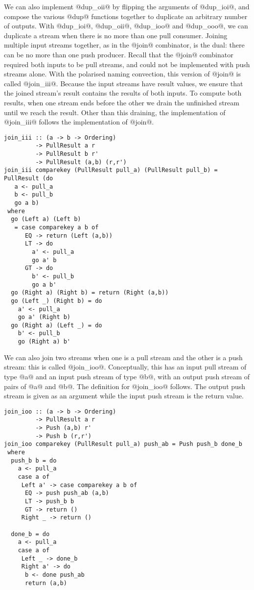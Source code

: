 We can also implement @dup_oii@ by flipping the arguments of @dup_ioi@, and compose the various @dup@ functions together to duplicate an arbitrary number of outputs.
With @dup_ioi@, @dup_oii@, @dup_ioo@ and @dup_ooo@, we can duplicate a stream when there is no more than one pull consumer.
Joining multiple input streams together, as in the @join@ combinator, is the dual: there can be no more than one push producer.
Recall that the @join@ combinator required both inputs to be pull streams, and could not be implemented with push streams alone.
With the polarised naming convection, this version of @join@ is called @join_iii@.
Because the input streams have result values, we ensure that the joined stream's result contains the results of both inputs.
To compute both results, when one stream ends before the other we drain the unfinished stream until we reach the result.
Other than this draining, the implementation of @join_iii@ follows the implementation of @join@.

\begin{lstlisting}
join_iii :: (a -> b -> Ordering)
         -> PullResult a r
         -> PullResult b r'
         -> PullResult (a,b) (r,r')
join_iii comparekey (PullResult pull_a) (PullResult pull_b) = PullResult (do
   a <- pull_a
   b <- pull_b
   go a b)
 where
  go (Left a) (Left b)
   = case comparekey a b of
      EQ -> return (Left (a,b))
      LT -> do
        a' <- pull_a
        go a' b
      GT -> do
        b' <- pull_b
        go a b'
  go (Right a) (Right b) = return (Right (a,b))
  go (Left _) (Right b) = do
    a' <- pull_a
    go a' (Right b)
  go (Right a) (Left _) = do
    b' <- pull_b
    go (Right a) b'
\end{lstlisting}


We can also join two streams when one is a pull stream and the other is a push stream: this is called @join_ioo@.
Conceptually, this has an input pull stream of type @a@ and an input push stream of type @b@, with an output push stream of pairs of @a@ and @b@.
The definition for @join_ioo@ follows.
The output push stream is given as an argument while the input push stream is the return value.

\begin{lstlisting}
join_ioo :: (a -> b -> Ordering)
         -> PullResult a r
         -> Push (a,b) r'
         -> Push b (r,r')
join_ioo comparekey (PullResult pull_a) push_ab = Push push_b done_b
 where
  push_b b = do
    a <- pull_a
    case a of
     Left a' -> case comparekey a b of
      EQ -> push push_ab (a,b)
      LT -> push_b b
      GT -> return ()
     Right _ -> return () 

  done_b = do
    a <- pull_a
    case a of
     Left _ -> done_b
     Right a' -> do
      b <- done push_ab
      return (a,b)
\end{lstlisting}

